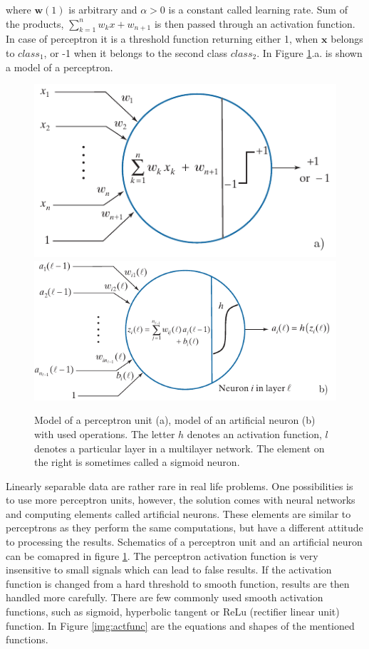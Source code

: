 where $\bm{w}(1)$ is arbitrary and $\alpha > 0$ is a constant called learning rate. Sum of the products, $\sum_{k=1}^{n}w_kx  + w_{n+1}$ is then passed through an activation function. In case of perceptron it is a threshold function returning either 1, when $\bm{x}$ belongs to $class_1$, or -1 when it belongs to the second class $class_2$. In Figure \ref*{img:percneuron}.a.
is shown a model of a perceptron.\cite{raisi2020text}

\begin{figure}[hbtp]
    \centering
    \includegraphics[scale=0.41]{obrazky/perceptron.png}
    \includegraphics[scale=0.41]{obrazky/artneuron.png}

    \caption{Model of a perceptron unit (a), model of an artificial neuron (b) with used operations. The letter $h$ denotes an activation function, $l$ denotes a particular layer in a multilayer network. The element on the right is sometimes called a sigmoid neuron.\cite{DIP}}
    \label{img:percneuron}
\end{figure}

Linearly separable data are rather rare in real life problems. One possibilities is to use more perceptron units, however, the solution comes with neural networks and computing elements called artificial neurons. These elements are similar to perceptrons as they perform the same computations, but have a different attitude to processing the results. Schematics of a perceptron unit and an artificial neuron can be comapred in figure \ref*{img:percneuron}.
The perceptron activation function is very insensitive to small signals which can lead to false results. If the activation function is changed from a hard threshold to smooth function, results are then handled more carefully. There are few commonly used smooth activation functions, such as sigmoid, hyperbolic tangent or ReLu (rectifier linear unit) function. In Figure \ref*{img:actfunc} are the equations and shapes of the mentioned functions.\cite{DIP}

